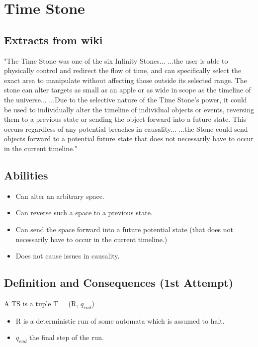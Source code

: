 \documentclass{report}
\begin{document}
\chapter{Time Stone}

\section{Extracts from wiki}

"The Time Stone was one of the six Infinity Stones... ...the user is able to physically control and redirect the flow of time, and can specifically select the exact area to manipulate without affecting those outside its selected range. The stone can alter targets as small as an apple or as wide in scope as the timeline of the universe... ...Due to the selective nature of the Time Stone's power, it could be used to individually alter the timeline of individual objects or events, reversing them to a previous state or sending the object forward into a future state. This occurs regardless of any potential breaches in causality... ...the Stone could send objects forward to a potential future state that does not necessarily have to occur in the current timeline."

\section{Abilities}

\begin{itemize}
  \item Can alter an arbitrary space.
  \item Can reverse such a space to a previous state.
  \item Can send the space forward into a future potential state (that does not necessarily have to occur in the current timeline.)
  \item Does not cause issues in causality.
\end{itemize}

\newpage
\section{Definition and Consequences (1st Attempt)}

A TS is a tuple T = (R, $q_{end}$)

\begin{itemize}
  \item R is a deterministic run of some automata which is assumed to halt.
  \item $q_{end}$ the final step of the run.
\end{itemize}
\end{document}
